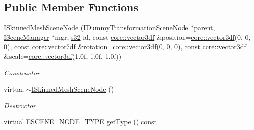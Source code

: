 \subsection*{Public Member Functions}
\begin{DoxyCompactItemize}
\item 
\hyperlink{classirr_1_1scene_1_1ISkinnedMeshSceneNode_af3e1741041a378a668fca3510214260c}{I\+Skinned\+Mesh\+Scene\+Node} (\hyperlink{classirr_1_1scene_1_1IDummyTransformationSceneNode}{I\+Dummy\+Transformation\+Scene\+Node} $\ast$parent, \hyperlink{classirr_1_1scene_1_1ISceneManager}{I\+Scene\+Manager} $\ast$mgr, \hyperlink{namespaceirr_ac66849b7a6ed16e30ebede579f9b47c6}{s32} id, const \hyperlink{namespaceirr_1_1core_a06f169d08b5c429f5575acb7edbad811}{core\+::vector3df} \&position=\hyperlink{namespaceirr_1_1core_a06f169d08b5c429f5575acb7edbad811}{core\+::vector3df}(0, 0, 0), const \hyperlink{namespaceirr_1_1core_a06f169d08b5c429f5575acb7edbad811}{core\+::vector3df} \&rotation=\hyperlink{namespaceirr_1_1core_a06f169d08b5c429f5575acb7edbad811}{core\+::vector3df}(0, 0, 0), const \hyperlink{namespaceirr_1_1core_a06f169d08b5c429f5575acb7edbad811}{core\+::vector3df} \&scale=\hyperlink{namespaceirr_1_1core_a06f169d08b5c429f5575acb7edbad811}{core\+::vector3df}(1.\+0f, 1.\+0f, 1.\+0f))\hypertarget{classirr_1_1scene_1_1ISkinnedMeshSceneNode_af3e1741041a378a668fca3510214260c}{}\label{classirr_1_1scene_1_1ISkinnedMeshSceneNode_af3e1741041a378a668fca3510214260c}

\begin{DoxyCompactList}\small\item\em Constructor. \end{DoxyCompactList}\item 
virtual \hyperlink{classirr_1_1scene_1_1ISkinnedMeshSceneNode_a6209924b450ae29d61ac00eb412ac52a}{$\sim$\+I\+Skinned\+Mesh\+Scene\+Node} ()\hypertarget{classirr_1_1scene_1_1ISkinnedMeshSceneNode_a6209924b450ae29d61ac00eb412ac52a}{}\label{classirr_1_1scene_1_1ISkinnedMeshSceneNode_a6209924b450ae29d61ac00eb412ac52a}

\begin{DoxyCompactList}\small\item\em Destructor. \end{DoxyCompactList}\item 
virtual \hyperlink{namespaceirr_1_1scene_acad3d7ef92a9807d391ba29120f3b7bd}{E\+S\+C\+E\+N\+E\+\_\+\+N\+O\+D\+E\+\_\+\+T\+Y\+PE} \hyperlink{classirr_1_1scene_1_1ISkinnedMeshSceneNode_a9624f557ef2236424cc26ce9a6d1a9c1}{get\+Type} () const \hypertarget{classirr_1_1scene_1_1ISkinnedMeshSceneNode_a9624f557ef2236424cc26ce9a6d1a9c1}{}\label{classirr_1_1scene_1_1ISkinnedMeshSceneNode_a9624f557ef2236424cc26ce9a6d1a9c1}


\end{DoxyCompactItemize}
